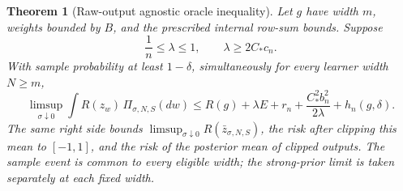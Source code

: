 \documentclass[11pt]{article}
\newtheorem{theorem}{Theorem}[section]
\theoremstyle{definition}\newtheorem{definition}[theorem]{Definition}
\theoremstyle{remark}\newtheorem{remark}[theorem]{Remark}
\begin{document}
\begin{theorem}[Raw-output agnostic oracle inequality]
\label{thm:oracle}
Let $g$ have width $m$, weights bounded by $B$, and the prescribed internal row-sum bounds. Suppose
\begin{equation}
 \frac1n\leq\lambda\leq1,\qquad \lambda\geq2C_*c_n.
 \label{eq:calibration-condition}
\end{equation}
With sample probability at least $1-\delta$, simultaneously for every learner width $N\geq m$,
\begin{equation}
 \limsup_{\sigma\downarrow0}
      \int R(z_w)\,\Pi_{\sigma,N,S}(dw)
 \leq R(g)+\lambda E+r_n+\frac{C_*^2b_n^2}{2\lambda}
                    +h_n(g,\delta).
 \label{eq:oracle}
\end{equation}
The same right side bounds
$\limsup_{\sigma\downarrow0}R(\bar z_{\sigma,N,S})$, the risk after clipping this mean to $[-1,1]$, and the risk of the posterior mean of clipped outputs. The sample event is common to every eligible width; the strong-prior limit is taken separately at each fixed width.
\end{theorem}
\end{document}
